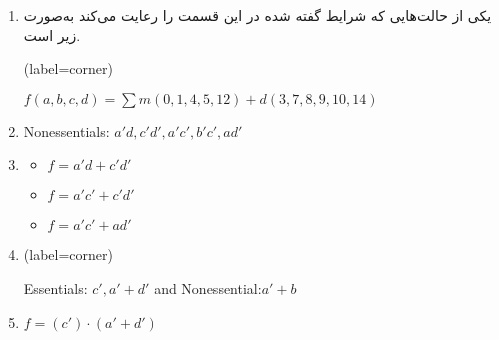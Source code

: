 \begin{enumerate}
	\item 
	یکی از حالت‌هایی که شرایط گفته شده در این قسمت را رعایت می‌کند به‌صورت زیر است.
	
	\begin{latin}
		\centering
		\begin{karnaugh-map}[4][4][1][$b$][$a$][$d$][$c$](label=corner)
		\end{karnaugh-map}

		$f(a,b,c,d)=\sum m(0,1,4,5,12) + d(3,7,8,9,10,14)$
	\end{latin}
	
	
	\item
	\begin{latin}
		Nonessentials: $a'd, c'd', a'c', b'c', ad'$
	\end{latin}
	
	
	\item
	\begin{latin}
		\begin{itemize}
			\item 
			$f = a'd + c'd'$
			
			\item 
			$f = a'c' + c'd'$
			
			\item 
			$f = a'c' + ad'$
		\end{itemize}
	\end{latin}
	
	
	\item 
	\begin{latin}
		\centering
		\begin{karnaugh-map}[4][4][1][$b$][$a$][$d$][$c$](label=corner)
		\end{karnaugh-map}

		Essentials: $c', a' + d'$ and Nonessential:$a' + b$
	\end{latin}
	
	
	\item 
	\begin{latin}
		$f=(c') \cdot (a'+d')$
	\end{latin}
	
\end{enumerate}




